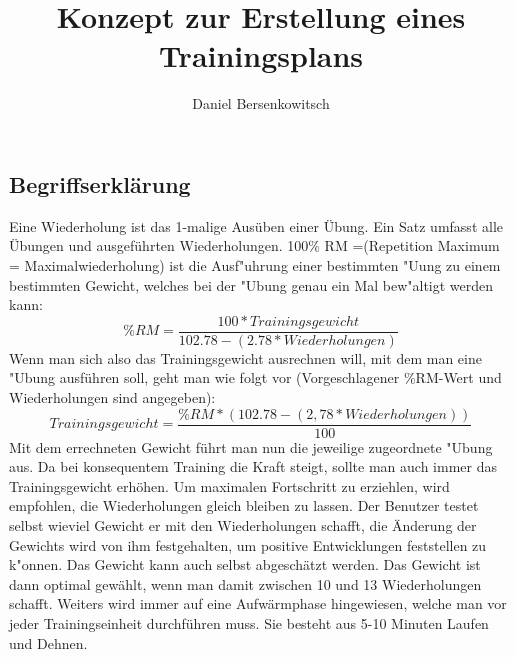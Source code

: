 \documentclass[FIPLY_base.tex]{subfiles}
\title{Konzept zur Erstellung eines Trainingsplans}
\author{Daniel Bersenkowitsch}
\begin{document}
	\subsection{Begriffserklärung}
	Eine \grqq{}Wiederholung\grqq{} ist das 1-malige Ausüben einer Übung. 
	\newline
	Ein \grqq{}Satz\grqq{} umfasst alle Übungen und ausgeführten Wiederholungen.
	100\% RM =(Repetition Maximum = Maximalwiederholung) ist die Ausf"uhrung einer bestimmten "Uung zu einem bestimmten Gewicht, welches bei der "Ubung genau ein Mal bew"altigt werden kann:
	\[\%RM=\frac{100*Trainingsgewicht}{102.78-(2.78*Wiederholungen)}\]
	Wenn man sich also das Trainingsgewicht ausrechnen will, mit dem man eine "Ubung ausführen soll, geht man wie folgt vor (Vorgeschlagener \%RM-Wert und Wiederholungen sind angegeben):
	\[Trainingsgewicht=\frac{\%RM*(102.78-(2,78*Wiederholungen))}{100}\]
	Mit dem errechneten Gewicht führt man nun die jeweilige zugeordnete "Ubung aus. Da  bei konsequentem Training die Kraft steigt, sollte man auch immer das Trainingsgewicht erhöhen. Um maximalen Fortschritt zu erziehlen, wird empfohlen, die Wiederholungen gleich bleiben zu lassen. Der Benutzer testet selbst wieviel Gewicht er mit den Wiederholungen schafft, die Änderung der Gewichts wird von ihm festgehalten, um positive Entwicklungen feststellen zu k"onnen. 
	\newline
	Das Gewicht kann auch selbst abgeschätzt werden. Das Gewicht ist dann optimal gewählt, wenn man damit zwischen 10 und 13 Wiederholungen schafft.
	Weiters wird immer auf eine Aufwärmphase hingewiesen, welche man vor jeder Trainingseinheit durchführen muss. Sie besteht aus 5-10 Minuten Laufen und Dehnen.
	
\end{document}
